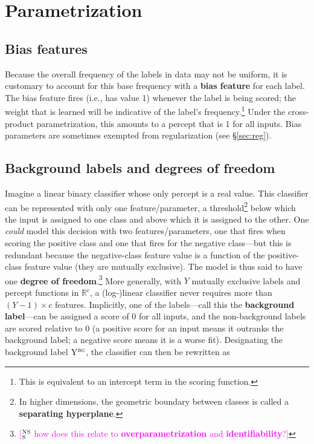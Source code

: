 \documentclass[11pt,letterpaper]{article}
\newcommand{\ensuretext}[1]{#1}
\newcommand{\nssmarker}{\ensuretext{\textcolor{magenta}{\ensuremath{^{\textsc{NS}}_{\textsc{S}}}}}}
\newcommand{\arkcomment}[3]{\ensuretext{\textcolor{#3}{[#1 #2]}}}
\newcommand{\nss}[1]{\arkcomment{\nssmarker}{#1}{magenta}}
\newcommand{\Sref}[1]{\S\ref{#1}}
\begin{document}
\section{Parametrization}\label{sec:param}

\subsection{Bias features}\label{sec:bias}

Because the overall frequency of the labels in data may not be uniform, 
it is customary to account for this base frequency with a {\bf bias feature} 
for each label. The bias feature fires (i.e., has value 1) whenever 
the label is being scored; the weight that is learned will be indicative of 
the label's frequency.\footnote{This is equivalent to an intercept term in the scoring function.} 
Under the cross-product parametrization, this amounts to a percept that is 1 for all inputs.
Bias parameters are sometimes exempted from regularization (see \Sref{sec:reg}).

\subsection{Background labels and degrees of freedom}\label{sec:bg}

Imagine a linear binary classifier whose only percept is a real value. 
This classifier can be represented with only one feature/parameter, a threshold\footnote{In higher dimensions, the geometric boundary between classes is called a {\bf separating hyperplane}.}
below which the input is assigned to one class and above which it is assigned to the other.
One {\em could} model this decision with two features/parameters, one that fires when scoring the positive class 
and one that fires for the negative class---but this is redundant because the negative-class feature value
is a function of the positive-class feature value (they are mutually exclusive).
The model is thus said to have one {\bf degree of freedom}.\footnote{\nss{how does this relate to {\bf overparametrization} and {\bf identifiability}?}}
More generally, with $Y$ mutually exclusive labels and percept functions in $\mathbb{R}^c$, a (log-)linear classifier 
never requires more than $(Y-1) \times c$ features. 
Implicitly, one of the labels---call this the {\bf background label}---can be assigned a score of 0 for all inputs, 
and the non-background labels are scored relative to 0 (a positive score for an input means it outranks the background label; 
a negative score means it is a worse fit). Designating the background label $\mathrm{Y}^{\textsc{bg}}$, the classifier can then be rewritten as
\end{document}
